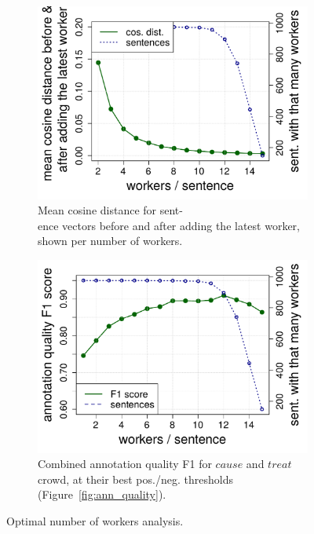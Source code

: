 \begin{figure}[htb!]
\centering
\begin{subfigure}{.5\textwidth}
\includegraphics[width=\linewidth]{img/cos_sim_per_worker.pdf}
\caption{Mean cosine distance for sent- \\ ence vectors before and after adding the latest worker, shown per number of workers.}
\label{fig:cos_sim_per_worker}
\end{subfigure}%
\begin{subfigure}{.5\textwidth}
\includegraphics[width=\linewidth]{img/ann_quality_f1.pdf}
\caption{Combined annotation quality F1 for $cause$ and $treat$ crowd, at their best pos./neg. thresholds (Figure~\ref{fig:ann_quality}).}
\label{fig:ann_quality_f1}
\end{subfigure}
\caption{Optimal number of workers analysis.}
\end{figure}


